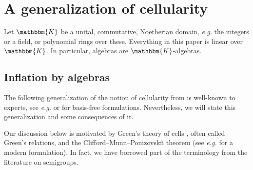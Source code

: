 \documentclass[a4paper,11pt]{amsart}
\newcommand{\eg}{\textsl{e.g.}}
\newcommand{\KK}{\mathbbm{K}}
\numberwithin{equation}{section}
\begin{document}
\section{A generalization of cellularity}\label{section:cells}

Let $\KK$ be a unital, commutative, Noetherian domain, {\eg} 
the integers or a field, or polynomial rings over these. Everything 
in this paper is linear over $\KK$. 
In particular, algebras are $\KK$-algebras.

\subsection{Inflation by algebras}\label{subsection:groups-inflation}

The following generalization of the notion 
of cellularity from \cite{GrLe-cellular} is well-known 
to experts, see {\eg} \cite{KoXi-cellular-inflation-morita}
or \cite{GuWi-almost-cellular} for
basis-free formulations.
Nevertheless, we will state this generalization and some consequences 
of it.

\begin{remark}\label{remark:green}
Our discussion below is motivated by Green's 
theory of cells \cite{Gr-semigroups},
often called Green's relations, 
and the Clifford--Munn--Ponizovski\u{\i} theorem 
(see {\eg} \cite{GaMaSt-irreps-semigroups} 
for a modern formulation). 
In fact, we have borrowed 
part of the terminology from the literature on semigroups.
\end{remark}
\end{document}
